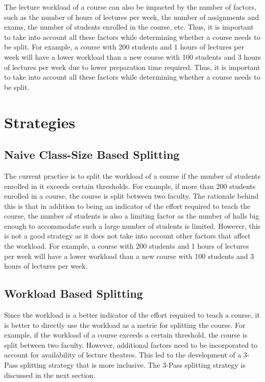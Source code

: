 The lecture workload of a course can also be impacted by the number of factors, such as the number of hours of lectures per week, the number of assignments and exams, the number of students enrolled in the course, etc. Thus, it is important to take into account all these factors while determining whether a course needs to be split. For example, a course with 200 students and 1 hours of lectures per week will have a lower workload than a new course with 100 students and 3 hours of lectures per week due to lower preparation time required. Thus, it is important to take into account all these factors while determining whether a course needs to be split.

\section{Strategies}



\subsection{Naive Class-Size Based Splitting}

The current practice is to split the workload of a course if the number of students enrolled in it exceeds certain thresholds. For example, if more than 200 students enrolled in a course, the course is split between two faculty. The rationale behind this is that in addition to being an indicator of the effort required to teach the course, the number of students is also a limiting factor as the number of halls big enough to accommodate such a large number of students is limited. However, this is not a good strategy as it does not take into account other factors that affect the workload. For example, a course with 200 students and 1 hours of lectures per week will have a lower workload than a new course with 100 students and 3 hours of lectures per week.

\subsection{Workload Based Splitting}

Since the workload is a better indicator of the effort required to teach a course, it is better to directly use the workload as a metric for splitting the course. For example, if the workload of a course exceeds a certain threshold, the course is split between two faculty. However, additional factors need to be incorporated to account for availability of lecture theatres. This led to the development of a 3-Pass splitting strategy that is more inclusive. The 3-Pass splitting strategy is discussed in the next section.

